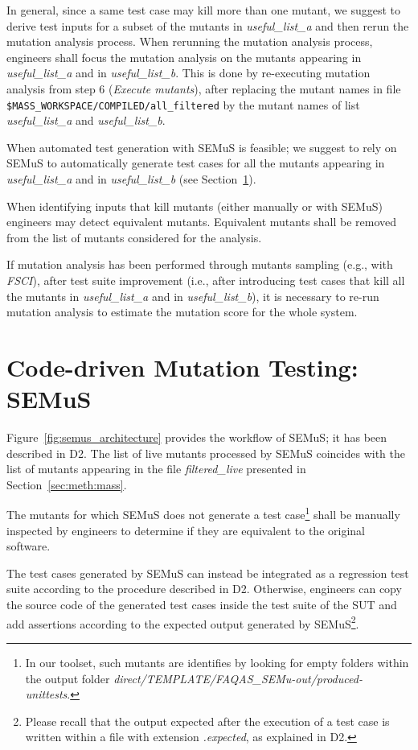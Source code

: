 In general, since a same test case may kill more than one mutant, we suggest to derive test inputs for a subset of the mutants in \emph{useful\_list\_a} and then rerun the mutation analysis process. When rerunning the mutation analysis process, engineers shall focus the mutation analysis on the mutants appearing in \emph{useful\_list\_a} and in \emph{useful\_list\_b}. This is done by re-executing mutation analysis from step 6 (\emph{Execute mutants}), after replacing the mutant names in file \texttt{\$MASS\_WORKSPACE/COMPILED/all\_filtered} by the mutant names of list \emph{useful\_list\_a} and \emph{useful\_list\_b}.

When automated test generation with SEMuS is feasible; we suggest to rely on SEMuS to automatically generate test cases for all the mutants appearing in \emph{useful\_list\_a} and in \emph{useful\_list\_b} (see Section~\ref{sec:meth:semus}). 

When identifying inputs that kill mutants (either manually or with SEMuS) engineers may detect equivalent mutants. Equivalent mutants shall be removed from the list of mutants considered for the analysis.

If mutation analysis has been performed through mutants sampling (e.g., with \emph{FSCI}), after test suite improvement (i.e., after introducing test cases that kill all the mutants in \emph{useful\_list\_a} and in \emph{useful\_list\_b}), it is necessary to re-run mutation analysis to estimate the mutation score for the whole system.

\clearpage
\section{Code-driven Mutation Testing: SEMuS}
\label{sec:meth:semus}

Figure~\ref{fig:semus_architecture} provides the workflow of SEMuS; it has been described in D2. The list of live mutants processed by SEMuS coincides with the list of mutants appearing in the file \emph{filtered\_live} presented in Section~\ref{sec:meth:mass}. 

The mutants for which SEMuS does not generate a test case\footnote{In our toolset, such mutants are identifies by looking for empty folders within the output folder \emph{direct/TEMPLATE/FAQAS\_SEMu-out/produced-unittests}.} shall be manually inspected by engineers to determine if they are equivalent to the original software.

The test cases generated by SEMuS can instead be integrated as a regression test suite according to the  procedure described in D2. Otherwise, engineers can copy the source code of the generated test cases inside the test suite of the SUT and add assertions according to the expected output generated by SEMuS\footnote{Please recall that the output expected after the execution of a test case is written within a file with extension \emph{.expected}, as explained in D2.}.

